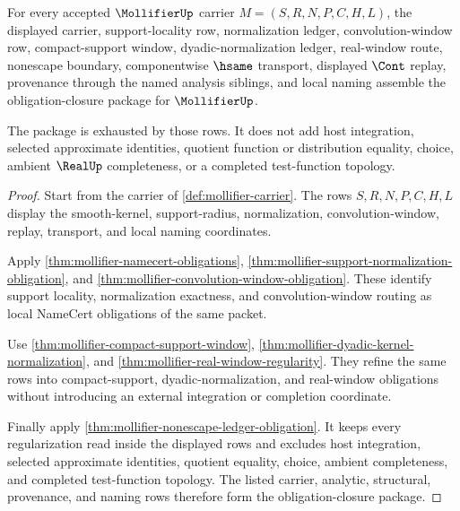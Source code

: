 \begin{theorem}
\label{thm:mollifier-obligation-closure-package}
For every accepted $\MollifierUp$ carrier $M=(S,R,N,P,C,H,L)$, the displayed carrier, support-locality row, normalization ledger, convolution-window row, compact-support window, dyadic-normalization ledger, real-window route, nonescape boundary, componentwise $\hsame$ transport, displayed $\Cont$ replay, provenance through the named analysis siblings, and local naming assemble the obligation-closure package for $\MollifierUp$.

The package is exhausted by those rows. It does not add host integration, selected approximate identities, quotient function or distribution equality, choice, ambient $\RealUp$ completeness, or a completed test-function topology.
\end{theorem}
\begin{proof}
Start from the carrier of \autoref{def:mollifier-carrier}. The rows $S,R,N,P,C,H,L$ display the smooth-kernel, support-radius, normalization, convolution-window, replay, transport, and local naming coordinates.

Apply \autoref{thm:mollifier-namecert-obligations}, \autoref{thm:mollifier-support-normalization-obligation}, and \autoref{thm:mollifier-convolution-window-obligation}. These identify support locality, normalization exactness, and convolution-window routing as local NameCert obligations of the same packet.

Use \autoref{thm:mollifier-compact-support-window}, \autoref{thm:mollifier-dyadic-kernel-normalization}, and \autoref{thm:mollifier-real-window-regularity}. They refine the same rows into compact-support, dyadic-normalization, and real-window obligations without introducing an external integration or completion coordinate.

Finally apply \autoref{thm:mollifier-nonescape-ledger-obligation}. It keeps every regularization read inside the displayed rows and excludes host integration, selected approximate identities, quotient equality, choice, ambient completeness, and completed test-function topology. The listed carrier, analytic, structural, provenance, and naming rows therefore form the obligation-closure package.
\end{proof}

